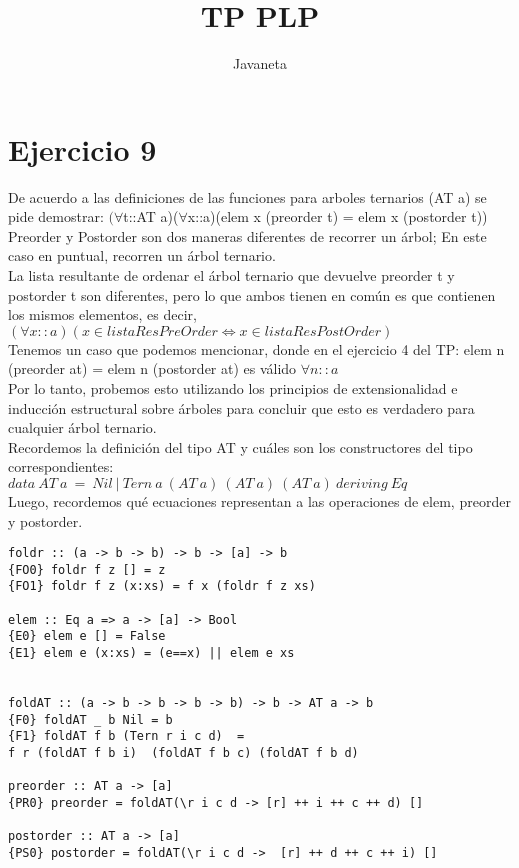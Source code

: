 \documentclass{article}
\title{TP PLP}
\author{Javaneta}
\begin{document}
\newcommand{\streq}[1]{\stackrel{\text{#1}}{=}}

\maketitle

\section{Ejercicio 9}
De acuerdo a las definiciones de las funciones para arboles ternarios (AT a) se pide demostrar: $(\forall$t::AT a)($\forall$x::a)(elem x (preorder t) = elem x (postorder t))  \\

Preorder y Postorder son dos maneras diferentes de recorrer un árbol; En este caso en puntual, recorren un árbol ternario.  \\

La lista resultante de ordenar el árbol ternario que devuelve preorder t y postorder t son diferentes, pero lo que ambos tienen en común es que contienen los mismos elementos, es decir, $(\forall x::a) (x \in listaResPreOrder \iff x \in listaResPostOrder)$ \\
Tenemos un caso que podemos mencionar, donde en el ejercicio 4 del TP: elem n (preorder at) = elem n (postorder at) es válido $\forall n::a$ \\

Por lo tanto, probemos esto utilizando los principios de extensionalidad e inducción estructural sobre árboles para concluir que esto es verdadero para cualquier árbol ternario.  \\

Recordemos la definición del tipo AT y cuáles son los constructores del tipo correspondientes: $ data \ AT \ a \ = \ Nil \ | \ Tern \ a \ (AT \ a) \ (AT \ a) \ (AT \ a) \ deriving \ Eq$ \\

Luego, recordemos qué ecuaciones representan a las operaciones de elem, preorder y postorder. 

\begin{lstlisting}
foldr :: (a -> b -> b) -> b -> [a] -> b
{FO0} foldr f z [] = z
{FO1} foldr f z (x:xs) = f x (foldr f z xs)

elem :: Eq a => a -> [a] -> Bool
{E0} elem e [] = False
{E1} elem e (x:xs) = (e==x) || elem e xs


foldAT :: (a -> b -> b -> b -> b) -> b -> AT a -> b 
{F0} foldAT _ b Nil = b 
{F1} foldAT f b (Tern r i c d)  = 
f r (foldAT f b i)  (foldAT f b c) (foldAT f b d)

preorder :: AT a -> [a]
{PR0} preorder = foldAT(\r i c d -> [r] ++ i ++ c ++ d) []

postorder :: AT a -> [a]
{PS0} postorder = foldAT(\r i c d ->  [r] ++ d ++ c ++ i) []
\end{lstlisting}
\end{document}
